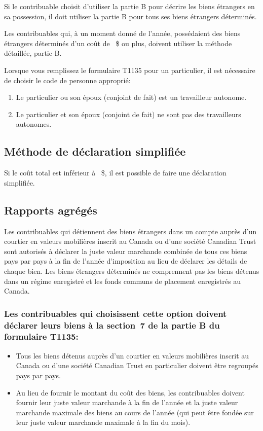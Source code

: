 \begin{note}
	Si le contribuable choisit d'utiliser la partie B pour décrire les biens étrangers en sa possession, il doit utiliser la partie B pour tous ses biens étrangers déterminés.
\end{note}

Les contribuables qui, à un moment donné de l'année, possédaient des biens étrangers déterminés d'un coût de ~\$    ou plus, doivent utiliser la méthode détaillée, partie B.

\begin{note}
	Lorsque vous remplissez le formulaire T1135 pour un particulier, il est nécessaire de choisir le code de personne approprié:
	\begin{enumerate}
		\item Le particulier ou son époux (conjoint de fait) est un travailleur autonome.
		\item Le particulier et son époux (conjoint de fait) ne sont pas des travailleurs autonomes.
	\end{enumerate}
\end{note}


\subsection{Méthode de déclaration simplifiée}
Si le coût total est inférieur à ~\$, il est possible de faire une déclaration simplifiée.


\subsection{Rapports agrégés}
Les contribuables qui détiennent des biens étrangers dans un compte auprès d'un courtier en valeurs mobilières inscrit au Canada ou d'une société Canadian Trust sont autorisés à déclarer la juste valeur marchande combinée de tous ces biens pays par pays à la fin de l'année d'imposition au lieu de déclarer les détails de chaque bien. Les biens étrangers déterminés ne comprennent pas les biens détenus dans un régime enregistré et les fonds communs de placement enregistrés au Canada.

\subsubsection{Les contribuables qui choisissent cette option doivent déclarer leurs biens à la section~7 de la partie B du formulaire T1135:}
\begin{itemize}
	\item Tous les biens détenus auprès d'un courtier en valeurs mobilières inscrit au Canada ou d'une société Canadian Trust en particulier doivent être regroupés pays par pays.
	\item Au lieu de fournir le montant du coût des biens, les contribuables doivent fournir leur juste valeur marchande à la fin de l'année et la juste valeur marchande maximale des biens au cours de l'année (qui peut être fondée sur leur juste valeur marchande maximale à la fin du mois).
\end{itemize}

